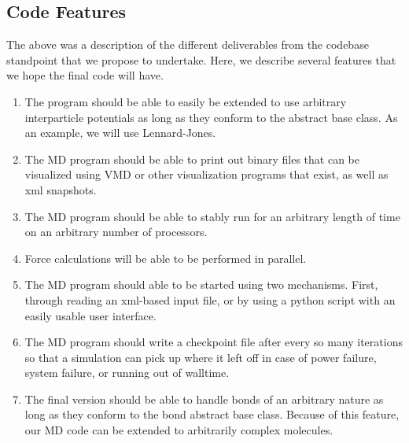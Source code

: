 \documentclass[10pt]{article}
\begin{document}
\subsection{Code Features}
The above was a description of the different deliverables from the codebase standpoint that we propose to undertake. Here, we describe several features that we hope the final code will have.
\begin{enumerate}
    \item The program should be able to easily be extended to use arbitrary interparticle potentials as long as they conform to the abstract base class. As an example, we will use Lennard-Jones.
    \item The MD program should be able to print out binary files that can be visualized using VMD or other visualization programs that exist, as well as xml snapshots.
    \item The MD program should be able to stably run for an arbitrary length of time on an arbitrary number of processors.
    \item Force calculations will be able to be performed in parallel.
    \item The MD program should able to be started using two mechanisms. First, through reading an xml-based input file, or by using a python script with an easily usable user interface.
    \item The MD program should write a checkpoint file after every so many iterations so that a simulation can pick up where it left off in case of power failure, system failure, or running out of walltime.
    \item The final version should be able to handle bonds of an arbitrary nature as long as they conform to the bond abstract base class. Because of this feature, our MD code can be extended to arbitrarily complex molecules.
\end{enumerate}
\end{document}
